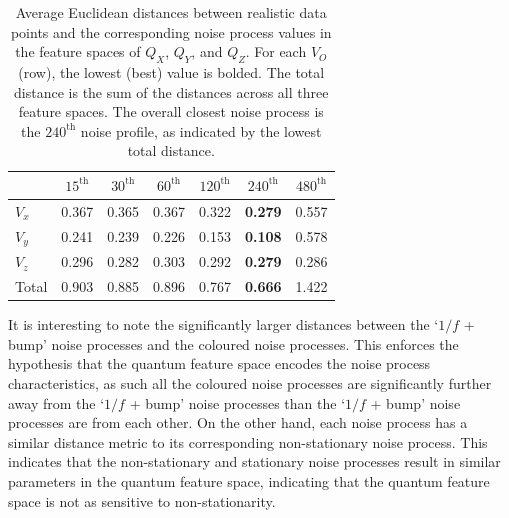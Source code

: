 \documentclass[12pt]{iopart}
\begin{document}
\begin{table}[ht]
    \centering
    \begin{tabular}{lcccccc}
        \toprule
              & $15^\mathrm{th}$ & $30^\mathrm{th}$ & $60^\mathrm{th}$ & $120^\mathrm{th}$ & $240^\mathrm{th}$ & $480^\mathrm{th}$ \\
        \midrule
        $V_x$ & 0.367            & 0.365            & 0.367            & 0.322             & \textbf{0.279}    & 0.557             \\
        $V_y$ & 0.241            & 0.239            & 0.226            & 0.153             & \textbf{0.108}    & 0.578             \\
        $V_z$ & 0.296            & 0.282            & 0.303            & 0.292             & \textbf{0.279}    & 0.286             \\
        \midrule
 Total & 0.903            & 0.885            & 0.896            & 0.767             & \textbf{0.666}    & 1.422             \\
        \bottomrule
    \end{tabular}
    \caption{Average Euclidean distances between realistic data points and the corresponding noise process values in the feature spaces of \(Q_X\), \(Q_Y\), and \(Q_Z\). For each \(V_O\) (row), the lowest (best) value is bolded. The total distance is the sum of the distances across all three feature spaces. The overall closest noise process is the $240^\mathrm{th}$ noise profile, as indicated by the lowest total distance.}
    \label{tab:noise_profiles2}
\end{table}

It is interesting to note the significantly larger distances between the `$1/f$ + bump' noise processes and the coloured noise processes. This enforces the hypothesis that the quantum feature space encodes the noise process characteristics, as such all the coloured noise processes are significantly further away from the `$1/f$ + bump' noise processes than the `$1/f$ + bump' noise processes are from each other. On the other hand, each noise process has a similar distance metric to its corresponding non-stationary noise process. This indicates that the non-stationary and stationary noise processes result in similar parameters in the quantum feature space, indicating that the quantum feature space is not as sensitive to non-stationarity.
\end{document}
